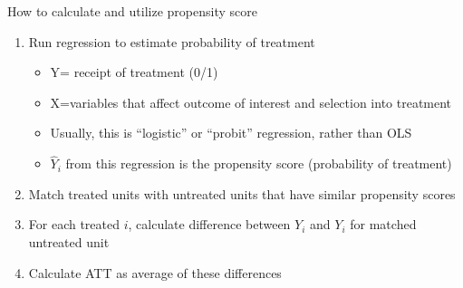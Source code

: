 \begin{frame}{How to calculate and utilize propensity score}
	
	\begin{enumerate}
		\item Run regression to estimate probability of treatment
		\begin{itemize}
			\item Y= receipt of treatment (0/1)
			\item X=variables that affect outcome of interest and selection into treatment
			\item Usually, this is ``logistic'' or ``probit'' regression, rather than OLS
			\item $\hat{Y}_i$ from this regression is the propensity score (probability of treatment)
		\end{itemize}
		\item Match treated units with untreated units that have similar propensity scores
		\item For each treated $i$, calculate difference between $Y_i$ and $Y_i$ for matched untreated unit
		\item Calculate ATT as average of these differences
	\end{enumerate}
\end{frame}

